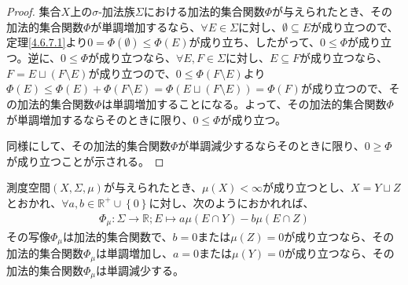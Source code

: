 \documentclass[dvipdfmx]{jsarticle}
\begin{document}
\begin{proof}
集合$X$上の$\sigma$-加法族$\varSigma$における加法的集合関数$\varPhi$が与えられたとき、その加法的集合関数$\varPhi$が単調増加するなら、$\forall E \in \varSigma$に対し、$\emptyset \subseteq E$が成り立つので、定理\ref{4.6.7.1}より$0 = \varPhi(\emptyset) \leq \varPhi(E)$が成り立ち、したがって、$0 \leq \varPhi$が成り立つ。逆に、$0 \leq \varPhi$が成り立つなら、$\forall E,F \in \varSigma$に対し、$E \subseteq F$が成り立つなら、$F = E \sqcup (F \setminus E)$が成り立つので、$0 \leq \varPhi(F \setminus E)$より$\varPhi(E) \leq \varPhi(E) + \varPhi(F \setminus E) = \varPhi\left( E \sqcup (F \setminus E) \right) = \varPhi(F)$が成り立つので、その加法的集合関数$\varPhi$は単調増加することになる。よって、その加法的集合関数$\varPhi$が単調増加するならそのときに限り、$0 \leq \varPhi$が成り立つ。\par
同様にして、その加法的集合関数$\varPhi$が単調減少するならそのときに限り、$0 \geq \varPhi$が成り立つことが示される。
\end{proof}
\begin{thm}\label{4.6.7.4}
測度空間$(X,\varSigma,\mu)$が与えられたとき、$\mu(X) < \infty$が成り立つとし、$X = Y \sqcup Z$とおかれ、$\forall a,b \in \mathbb{R}^{+} \cup \left\{ 0 \right\}$に対し、次のようにおかれれば、
\begin{align*}
\varPhi_{\mu}:\varSigma \rightarrow \mathbb{R};E \mapsto a\mu(E \cap Y) - b\mu(E \cap Z)
\end{align*}
その写像$\varPhi_{\mu}$は加法的集合関数で、$b = 0$または$\mu(Z) = 0$が成り立つなら、その加法的集合関数$\varPhi_{\mu}$は単調増加し、$a = 0$または$\mu(Y) = 0$が成り立つなら、その加法的集合関数$\varPhi_{\mu}$は単調減少する。
\end{thm}
\end{document}
